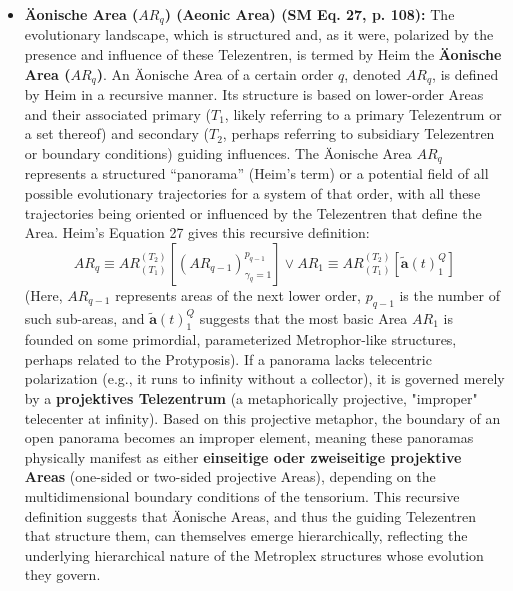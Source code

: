 \documentclass[12pt]{article}
\newcommand{\q}[1]{\enquote{#1}}
\newcommand{\metrophor}{\bm{\widetilde{a}}}
\newcommand{\aeonischearea}{AR_q}
\begin{document}
\begin{itemize}
    \item \textbf{\"{A}onische Area (\( \aeonischearea \)) (Aeonic Area) (SM Eq. 27, p. 108):}
    The evolutionary landscape, which is structured and, as it were, polarized by the presence and influence of these Telezentren, is termed by Heim the \textbf{\"{A}onische Area (\(\aeonischearea\))}. An Äonische Area of a certain order \( q \), denoted \( \aeonischearea \), is defined by Heim in a recursive manner. Its structure is based on lower-order Areas and their associated primary (\( T_1 \), likely referring to a primary Telezentrum or a set thereof) and secondary (\( T_2 \), perhaps referring to subsidiary Telezentren or boundary conditions) guiding influences. The Äonische Area \( \aeonischearea \) represents a structured \q{panorama} (Heim's term) or a potential field of all possible evolutionary trajectories for a system of that order, with all these trajectories being oriented or influenced by the Telezentren that define the Area. Heim's Equation 27 gives this recursive definition:
    \begin{equation}
    \aeonischearea \equiv AR_{(T_1)}^{(T_2)} [(AR_{q-1})_{\gamma_q=1}^{p_{q-1}}] \vee AR_1 \equiv AR_{(T_1)}^{(T_2)} [\metrophor(t)_1^Q]
    \label{eq:original_aeonische_area}
    \end{equation}
    (Here, \(AR_{q-1}\) represents areas of the next lower order, \(p_{q-1}\) is the number of such sub-areas, and \( \metrophor(t)_1^Q \) suggests that the most basic Area \(AR_1\) is founded on some primordial, parameterized Metrophor-like structures, perhaps related to the Protyposis). If a panorama lacks telecentric polarization (e.g., it runs to infinity without a collector), it is governed merely by a \textbf{projektives Telezentrum} (a metaphorically projective, "improper" telecenter at infinity). Based on this projective metaphor, the boundary of an open panorama becomes an improper element, meaning these panoramas physically manifest as either \textbf{einseitige oder zweiseitige projektive Areas} (one-sided or two-sided projective Areas), depending on the multidimensional boundary conditions of the tensorium.
    This recursive definition suggests that Äonische Areas, and thus the guiding Telezentren that structure them, can themselves emerge hierarchically, reflecting the underlying hierarchical nature of the Metroplex structures whose evolution they govern.


\end{itemize}
\end{document}
